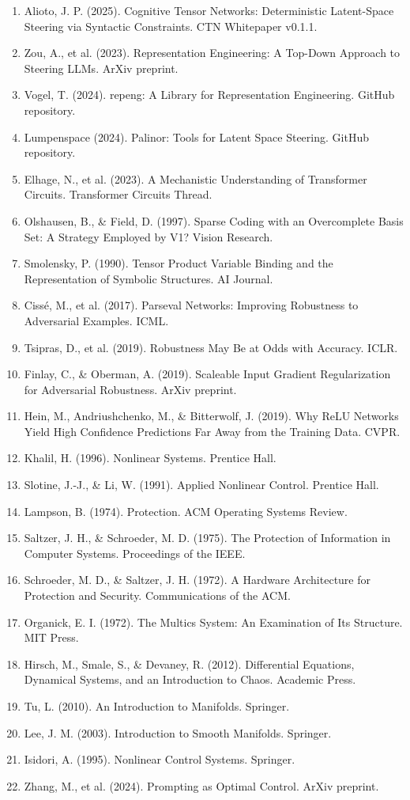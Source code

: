 \documentclass[11pt,a4paper]{article}
\begin{document}
\begin{enumerate}
    \item Alioto, J. P. (2025). Cognitive Tensor Networks: Deterministic Latent-Space Steering via Syntactic Constraints. CTN Whitepaper v0.1.1.
    \item Zou, A., et al. (2023). Representation Engineering: A Top-Down Approach to Steering LLMs. ArXiv preprint.
    \item Vogel, T. (2024). repeng: A Library for Representation Engineering. GitHub repository.
    \item Lumpenspace (2024). Palinor: Tools for Latent Space Steering. GitHub repository.
    \item Elhage, N., et al. (2023). A Mechanistic Understanding of Transformer Circuits. Transformer Circuits Thread.
    \item Olshausen, B., \& Field, D. (1997). Sparse Coding with an Overcomplete Basis Set: A Strategy Employed by V1? Vision Research.
    \item Smolensky, P. (1990). Tensor Product Variable Binding and the Representation of Symbolic Structures. AI Journal.
    \item Ciss\'e, M., et al. (2017). Parseval Networks: Improving Robustness to Adversarial Examples. ICML.
    \item Tsipras, D., et al. (2019). Robustness May Be at Odds with Accuracy. ICLR.
    \item Finlay, C., \& Oberman, A. (2019). Scaleable Input Gradient Regularization for Adversarial Robustness. ArXiv preprint.
    \item Hein, M., Andriushchenko, M., \& Bitterwolf, J. (2019). Why ReLU Networks Yield High Confidence Predictions Far Away from the Training Data. CVPR.
    \item Khalil, H. (1996). Nonlinear Systems. Prentice Hall.
    \item Slotine, J.-J., \& Li, W. (1991). Applied Nonlinear Control. Prentice Hall.
    \item Lampson, B. (1974). Protection. ACM Operating Systems Review.
    \item Saltzer, J. H., \& Schroeder, M. D. (1975). The Protection of Information in Computer Systems. Proceedings of the IEEE.
    \item Schroeder, M. D., \& Saltzer, J. H. (1972). A Hardware Architecture for Protection and Security. Communications of the ACM.
    \item Organick, E. I. (1972). The Multics System: An Examination of Its Structure. MIT Press.
    \item Hirsch, M., Smale, S., \& Devaney, R. (2012). Differential Equations, Dynamical Systems, and an Introduction to Chaos. Academic Press.
    \item Tu, L. (2010). An Introduction to Manifolds. Springer.
    \item Lee, J. M. (2003). Introduction to Smooth Manifolds. Springer.
    \item Isidori, A. (1995). Nonlinear Control Systems. Springer.
    \item Zhang, M., et al. (2024). Prompting as Optimal Control. ArXiv preprint.
\end{enumerate}
\end{document}
